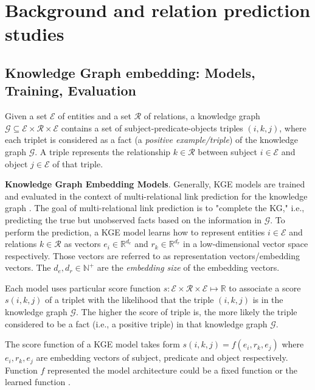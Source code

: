 
\chapter{Background and relation prediction studies}

\section[Knowledge Graph embedding (KGE)]{Knowledge Graph embedding: Models, Training, Evaluation}

Given a set $\mathcal{E}$ of entities and a set $\mathcal{R}$ of relations, a knowledge graph $\mathcal{G} \subseteq \mathcal{E} \times \mathcal{R} \times \mathcal{E}$ contains a set of subject-predicate-objects triples $(i,k,j)$, where each triplet is considered as a fact (a \textit{positive example/triple}) of the knowledge graph $\mathcal{G}$. A triple represents the relationship $k \in \mathcal{R}$ between subject $i \in \mathcal{E}$ and object $j \in \mathcal{E}$ of that triple. 
\newline

\noindent\textbf{Knowledge Graph Embedding Models}. Generally, KGE models are trained and evaluated in the context of multi-relational link prediction for the knowledge graph \citep{Ruffinelli2020You}. The goal of multi-relational link prediction is to "complete the KG," i.e., predicting the true but unobserved facts based on the information in $\mathcal{G}$. To perform the prediction, a KGE model learns how to represent entities $ i \in \mathcal{E}$ and relations $k \in \mathcal{R}$ as vectors $e_i \in \mathbb{R}^{d_e}$ and $r_k \in \mathbb{R}^{d_r}$ in a low-dimensional vector space respectively. Those vectors are referred to as representation vectors/embedding vectors. The $d_e, d_r \in \mathbb{N}^+$ are the \textit{embedding size} of the embedding vectors.

Each model uses particular score function $s: \mathcal{E} \times \mathcal{R} \times \mathcal{E} \mapsto \mathbb{R}$ to associate a score $s(i,k,j)$ of a triplet with the likelihood that the triple $(i,k,j)$ is in the knowledge graph $\mathcal{G}$. The higher the score of triple is, the more likely the triple considered to be a fact (i.e., a positive triple) in that knowledge graph $\mathcal{G}$. 

The score function of a KGE model takes form $s(i,k,j) = f(e_i, r_k, e_j)$ where $e_i, r_k, e_j$ are embedding vectors of subject, predicate and object respectively. Function $f$ represented the model architecture could be a fixed function or the learned function \citep{Ruffinelli2020You}. 
\newline


